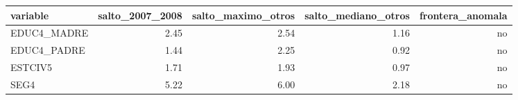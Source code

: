 \begin{tabular}{lrrrr}
\toprule
variable & salto\_2007\_2008 & salto\_maximo\_otros & salto\_mediano\_otros & frontera\_anomala \\
\midrule
EDUC4\_MADRE & 2.45 & 2.54 & 1.16 & no \\
EDUC4\_PADRE & 1.44 & 2.25 & 0.92 & no \\
ESTCIV5 & 1.71 & 1.93 & 0.97 & no \\
SEG4 & 5.22 & 6.00 & 2.18 & no \\
\bottomrule
\end{tabular}
